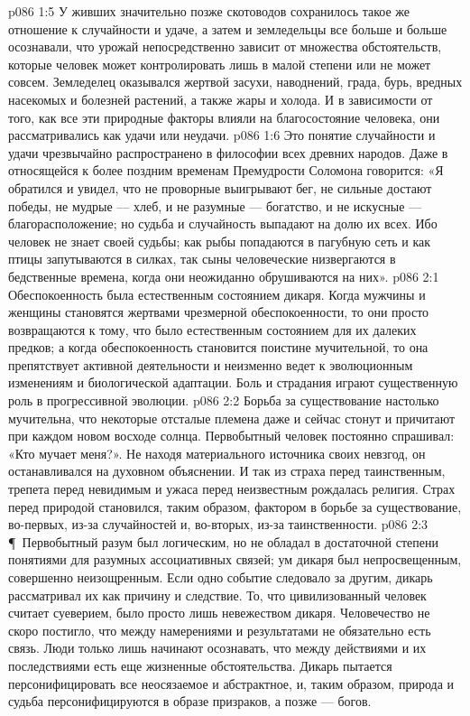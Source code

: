 \vs p086 1:5 У живших значительно позже скотоводов сохранилось такое же отношение к случайности и удаче, а затем и земледельцы все больше и больше осознавали, что урожай непосредственно зависит от множества обстоятельств, которые человек может контролировать лишь в малой степени или не может совсем. Земледелец оказывался жертвой засухи, наводнений, града, бурь, вредных насекомых и болезней растений, а также жары и холода. И в зависимости от того, как все эти природные факторы влияли на благосостояние человека, они рассматривались как удачи или неудачи.
\vs p086 1:6 Это понятие случайности и удачи чрезвычайно распространено в философии всех древних народов. Даже в относящейся к более поздним временам Премудрости Соломона говорится: «Я обратился и увидел, что не проворные выигрывают бег, не сильные достают победы, не мудрые --- хлеб, и не разумные --- богатство, и не искусные --- благорасположение; но судьба и случайность выпадают на долю их всех. Ибо человек не знает своей судьбы; как рыбы попадаются в пагубную сеть и как птицы запутываются в силках, так сыны человеческие низвергаются в бедственные времена, когда они неожиданно обрушиваются на них».
\vs p086 2:1 Обеспокоенность была естественным состоянием дикаря. Когда мужчины и женщины становятся жертвами чрезмерной обеспокоенности, то они просто возвращаются к тому, что было естественным состоянием для их далеких предков; а когда обеспокоенность становится поистине мучительной, то она препятствует активной деятельности и неизменно ведет к эволюционным изменениям и биологической адаптации. Боль и страдания играют существенную роль в прогрессивной эволюции.
\vs p086 2:2 Борьба за существование настолько мучительна, что некоторые отсталые племена даже и сейчас стонут и причитают при каждом новом восходе солнца. Первобытный человек постоянно спрашивал: «Кто мучает меня?». Не находя материального источника своих невзгод, он останавливался на духовном объяснении. И так из страха перед таинственным, трепета перед невидимым и ужаса перед неизвестным рождалась религия. Страх перед природой становился, таким образом, фактором в борьбе за существование, во\hyp{}первых, из\hyp{}за случайностей и, во\hyp{}вторых, из\hyp{}за таинственности.
\vs p086 2:3 \P\ Первобытный разум был логическим, но не обладал в достаточной степени понятиями для разумных ассоциативных связей; ум дикаря был непросвещенным, совершенно неизощренным. Если одно событие следовало за другим, дикарь рассматривал их как причину и следствие. То, что цивилизованный человек считает суеверием, было просто лишь невежеством дикаря. Человечество не скоро постигло, что между намерениями и результатами не обязательно есть связь. Люди только лишь начинают осознавать, что между действиями и их последствиями есть еще жизненные обстоятельства. Дикарь пытается персонифицировать все неосязаемое и абстрактное, и, таким образом, природа и судьба персонифицируются в образе призраков, а позже --- богов.
